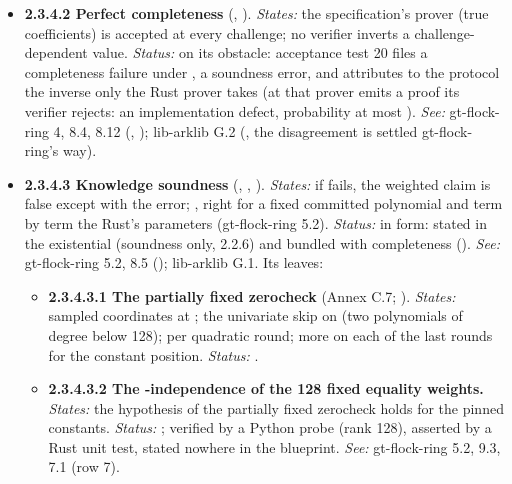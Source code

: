 \begin{itemize}[label={}, leftmargin=1.3em, itemindent=-1.3em, labelwidth=0pt, labelsep=0pt, itemsep=4pt, topsep=3pt]
\item {}\label{obl:node-2.3.4.2}\oblflag\textbf{2.3.4.2 Perfect completeness} (, ). \emph{States:} the specification's prover (true coefficients) is accepted at every challenge; no verifier inverts a challenge-dependent value. \emph{Status:}   on its obstacle: acceptance test 20 files a completeness failure under , a soundness error, and attributes to the protocol the inverse  only the Rust prover takes (at  that prover emits a proof its verifier rejects: an implementation defect, probability at most ). \emph{See:} gt-flock-ring 4, 8.4, 8.12 (, ); lib-arklib G.2 (, the disagreement is settled gt-flock-ring's way).
\item {}\label{obl:node-2.3.4.3}\oblflag\textbf{2.3.4.3 Knowledge soundness} (, , ). \emph{States:} if  fails, the weighted claim is false except with the error; , right for a fixed committed polynomial and term by term the Rust's parameters (gt-flock-ring 5.2). \emph{Status:}   in form: stated in the existential  (soundness only, 2.2.6) and bundled with completeness (). \emph{See:} gt-flock-ring 5.2, 8.5 (); lib-arklib G.1. Its leaves:
\begin{itemize}[label={}, leftmargin=1.3em, itemindent=-1.3em, labelwidth=0pt, labelsep=0pt, itemsep=4pt, topsep=3pt]
\item {}\label{obl:node-2.3.4.3.1}\textbf{2.3.4.3.1 The partially fixed zerocheck} (Annex C.7; ). \emph{States:}  sampled coordinates at ; the univariate skip  on  (two polynomials of degree below 128);  per quadratic round;  more on each of the last  rounds for the constant position. \emph{Status:} .
\item {}\label{obl:node-2.3.4.3.2}\textbf{2.3.4.3.2 The -independence of the 128 fixed equality weights.} \emph{States:} the hypothesis of the partially fixed zerocheck holds for the pinned constants. \emph{Status:} ; verified by a Python probe (rank 128), asserted by a Rust unit test, stated nowhere in the blueprint. \emph{See:} gt-flock-ring 5.2, 9.3, 7.1 (row 7).

\end{itemize}
\end{itemize}
